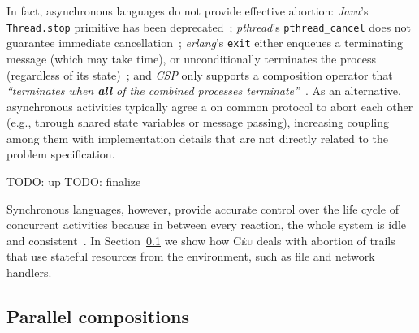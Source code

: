 \documentclass{acm_proc_article-sp}
\newcommand{\CEU}{\textsc{C\'{e}u}\xspace}
\newcommand{\code}[1] {{\small{\texttt{#1}}}}
\newcommand{\1}{\;}
\newcommand{\2}{\;\;}
\newcommand{\3}{\;\;\;}
\newcommand{\5}{\;\;\;\;\;}
\begin{document}
In fact, asynchronous languages do not provide effective abortion:
\emph{Java}'s \code{Thread.stop} primitive has been 
deprecated~\cite{sync_async.threadsstop};
\emph{pthread}'s \code{pthread\_cancel} does not guarantee immediate 
cancellation~\cite{sync_async.pthreadsstop};
\emph{erlang}'s \code{exit} either enqueues a terminating message (which may 
take time), or unconditionally terminates the process (regardless of its 
state)~\cite{sync_async.erlangstop};
and \emph{CSP} only supports a composition operator that \emph{``terminates 
when \textbf{all} of the combined processes terminate''}~\cite{async.csp}.
%
As an alternative, asynchronous activities typically agree a on common protocol 
to abort each other (e.g., through shared state variables or message passing), 
increasing coupling among them with implementation details that are not 
directly related to the problem specification.

TODO: up
TODO: finalize

Synchronous languages, however, provide accurate control over the life cycle of 
concurrent activities because in between every reaction, the whole system is 
idle and consistent~\cite{esterel.preemption}.
%
In Section~\ref{sec.ceu.par} we show how \CEU deals with abortion of trails 
that use stateful resources from the environment, such as file and network 
handlers.

%



\subsection{Parallel compositions}
\label{sec.ceu.par}

\end{document}
